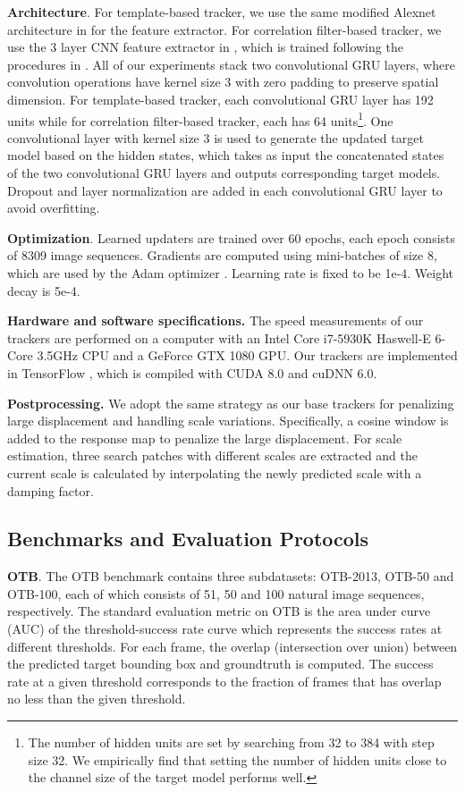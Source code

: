 \documentclass[journal]{IEEEtran}
\begin{document}
\textbf{Architecture}. For template-based tracker, we use the same modified Alexnet architecture in \cite{bertinetto2016fully} for the feature extractor. 
 For correlation filter-based tracker, we use the 3 layer CNN feature extractor in \cite{valmadre2017end}, which is trained following the procedures in \cite{bertinetto2016fully}. All of our experiments stack two convolutional GRU layers, where convolution operations have kernel size 3 with zero padding to preserve spatial dimension. For template-based tracker, each convolutional GRU layer has 192 units while for correlation filter-based tracker, each has 64 units\footnote{The number of hidden units are set by searching from 32 to 384 with step size 32. We empirically find that setting the number of hidden units close to the channel size of the target model performs well.}. One convolutional layer with kernel size 3 is used to generate the updated target model based on the hidden states, which takes as input the concatenated states of the two convolutional GRU layers and outputs corresponding target models. Dropout \cite{zaremba2014recurrent} and layer normalization \cite{ba2016layer} are added in each convolutional GRU layer to avoid overfitting.

\textbf{Optimization}. Learned updaters are trained over 60 epochs, each epoch consists of 8309 image sequences. Gradients are computed using mini-batches of size 8, which are used by the Adam optimizer \cite{kingma2014adam}. Learning rate is fixed to be 1e-4. Weight decay is 5e-4. 

\textbf{Hardware and software specifications.} The speed measurements of our trackers are performed on a computer with an Intel Core i7-5930K Haswell-E 6-Core 3.5GHz CPU and a GeForce GTX 1080 GPU. Our trackers are implemented in TensorFlow \cite{tensorflow2015-whitepaper}, which is compiled with CUDA 8.0 and cuDNN 6.0. 

\textbf{Postprocessing.} We adopt the same strategy as our base trackers for penalizing large displacement and handling scale variations. Specifically, a cosine window is added to the response map to penalize the large displacement. For scale estimation, three search patches with different scales are extracted and the current scale is calculated by interpolating the newly predicted scale with a damping factor.

\subsection{Benchmarks and Evaluation Protocols}
\textbf{OTB}. The OTB benchmark contains three subdatasets: OTB-2013, OTB-50 and OTB-100, each of which consists of 51, 50 and 100 natural image sequences, respectively. The standard evaluation metric on OTB is the area under curve (AUC) of the threshold-success rate curve which represents the success rates at different thresholds. For each frame, the overlap (intersection over union) between the predicted target bounding box and groundtruth is computed. The success rate at a given threshold corresponds to the fraction of frames that has overlap no less than the given threshold. 
\end{document}

